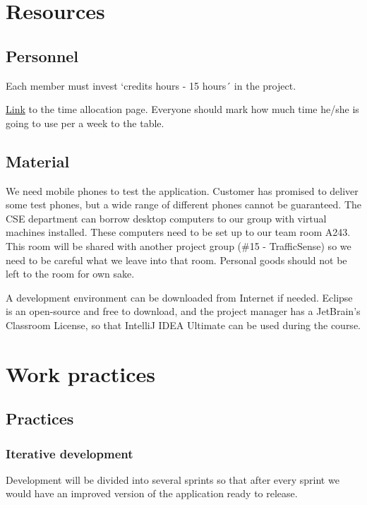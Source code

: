 \documentclass{report}
\begin{document}
\chapter{Resources}
\section{Personnel}

Each member must invest `credits  hours - 15 hours´ in the project.

\href{https://docs.google.com/spreadsheet/ccc?key=0Ahu59q_GwtcedHI3MnJQM0NWZS11aGxFTzFZeVEyQVE&usp=sharing}{Link} to the time allocation page. Everyone should mark how much time he/she is going to use per a week to the table.

\section{Material}

We need mobile phones to test the application. Customer has promised to deliver some test phones, but a wide range of different phones cannot be guaranteed. The CSE department can borrow desktop computers to our group with virtual machines installed. These computers need to be set up to our team room A243. This room will be shared with another project group (\#15 - TrafficSense) so we need to be careful what we leave into that room. Personal goods should not be left to the room for own sake.

A development environment can be downloaded from Internet if needed. Eclipse is an open-source and free to download, and the project manager has a JetBrain's Classroom License, so that IntelliJ IDEA Ultimate can be used during the course.

\chapter{Work practices}
\section{Practices}
\subsection{Iterative development}

Development will be divided into several sprints so that after every sprint we would have an improved version of the application ready to release.
\end{document}
